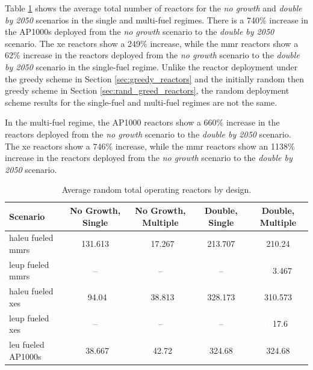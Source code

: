 Table \ref{tab:random_reac_avg} shows the average total number of reactors for the \textit{no growth} and \textit{double by 2050} scenarios in the single and multi-fuel regimes. There is a 740\% increase in the AP1000s deployed from the \textit{no growth} scenario to the \textit{double by 2050} scenario. The \gls{xe} reactors show a 249\% increase, while the \gls{mmr} reactors show a 62\% increase in the reactors deployed from the \textit{no growth} scenario to the \textit{double by 2050} scenario in the single-fuel regime. Unlike the reactor deployment under the greedy scheme in Section \ref{sec:greedy_reactors} and the initially random then greedy scheme in Section \ref{sec:rand_greed_reactors}, the random deployment scheme results for the single-fuel and multi-fuel regimes are not the same.

In the multi-fuel regime, the AP1000 reactors show a 660\% increase in the reactors deployed from the \textit{no growth} scenario to the \textit{double by 2050} scenario. The \gls{xe} reactors show a 746\% increase, while the \gls{mmr} reactors show an 1138\% increase in the reactors deployed from the \textit{no growth} scenario to the \textit{double by 2050} scenario.

\begin{table}[H]
    \centering
    \caption{Average random total operating reactors by design.}
    \label{tab:random_reac_avg}
    \begin{tabular}{l c c c c}
       \hline
       Scenario & No Growth, Single & No Growth, Multiple & Double, Single & Double, Multiple  \\
       \hline
       \gls{haleu} fueled \glspl{mmr} & 131.613 & \textcolor{white}{0}17.267  & 213.707 & 210.24  \\
       \gls{leup} fueled \glspl{mmr}  & --      & --      & --      & \textcolor{white}{00}3.467   \\
       \gls{haleu} fueled \glspl{xe}  & \textcolor{white}{0}94.04   & \textcolor{white}{0}38.813  & 328.173 & 310.573 \\
       \gls{leup} fueled \glspl{xe}   & --      & --      & --      & \textcolor{white}{0}17.6    \\
       \gls{leu} fueled AP1000s       & \textcolor{white}{0}38.667  & \textcolor{white}{0}42.72   & 324.68  & 324.68  \\
       \hline
    \end{tabular}
\end{table}




